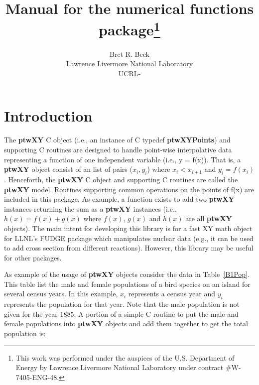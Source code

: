 \documentclass[11pt]{article}
\title{Manual for the numerical functions package\footnote{
This work was performed under the auspices of the U.S. Department of Energy by
Lawrence Livermore National Laboratory under contract \#W-7405-ENG-48.}}
\author{{Bret R. Beck}\\Lawrence Livermore National Laboratory\\UCRL-}
\newlength{\argumentNameWidth}
\newlength{\argumentNameOffset}
\newcommand{\setargumentNameLengths}[1]{
    \settowidth{\argumentNameWidth}{\tt #1: }
    \setlength{\argumentNameOffset}{\linewidth}
    \addtolength{\argumentNameOffset}{-1.\argumentNameWidth}
    \addtolength{\argumentNameOffset}{-0.05\linewidth}
}
\newcommand{\highlight}[1]{{\bf #1}}
\begin{document}
\setargumentNameLengths{interpolation}

\maketitle

\pagebreak
\tableofcontents
\listoftables
\pagebreak

\section{Introduction}
The \highlight{ptwXY} C object (i.e., an instance of C typedef \highlight{ptwXYPoints}) and supporting C routines are designed to 
handle point-wise interpolative data representing a function of one independent variable
(i.e., y = f(x)). That is, a \highlight{ptwXY} object consist of an 
list of pairs ($x_i,y_i$) where $x_{i} < x_{i+1}$ and $y_i = f(x_i)$. Henceforth, the \highlight{ptwXY} C object
and supporting C routines are called the \highlight{ptwXY} model. Routines supporting common operations 
on the points of f(x) are included in this package. As example, a function exists to add two \highlight{ptwXY} instances returning the sum
as a \highlight{ptwXY} instances (i.e., $h(x) = f(x) + g(x)$ where $f(x)$, $g(x)$ and $h(x)$ 
are all \highlight{ptwXY} objects). The main intent for developing this library is for a fast XY math object for LLNL's FUDGE package
which manipulates nuclear data (e.g., it can be used to add cross section from different reactions). However,
this library may be useful for other packages.

As example of the usage of \highlight{ptwXY} objects consider the data in Table~\ref{B1Pop}. This table list the male and female populations of a
bird species on an island for several census years. In this example, $x_i$ represents
a census year and $y_i$ represents the population for that year. Note that the male population is not
given for the year 1885. A portion of a simple C routine to put the male and female 
populations into \highlight{ptwXY} objects and add them together to get the total population is:
\end{document}
